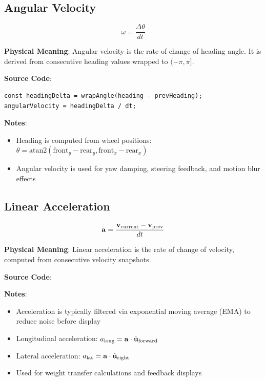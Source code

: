 \subsection{Angular Velocity}

\begin{equation}
  \omega = \frac{\Delta \theta}{dt}
  \label{eq:angular-velocity}
\end{equation}

\textbf{Physical Meaning}: Angular velocity is the rate of change of heading angle. It is derived from consecutive heading values wrapped to $(-\pi, \pi]$.

\textbf{Source Code}: 

\begin{lstlisting}[caption={Angular velocity computation with angle wrapping}]
const headingDelta = wrapAngle(heading - prevHeading);
angularVelocity = headingDelta / dt;
\end{lstlisting}

\textbf{Notes}:
\begin{itemize}
  \item Heading is computed from wheel positions: $\theta = \text{atan2}(\text{front}_y - \text{rear}_y, \text{front}_x - \text{rear}_x)$
  \item Angular velocity is used for yaw damping, steering feedback, and motion blur effects
\end{itemize}

\subsection{Linear Acceleration}

\begin{equation}
  \mathbf{a} = \frac{\mathbf{v}_{\text{current}} - \mathbf{v}_{\text{prev}}}{dt}
  \label{eq:linear-acceleration}
\end{equation}

\textbf{Physical Meaning}: Linear acceleration is the rate of change of velocity, computed from consecutive velocity snapshots.

\textbf{Source Code}: 

\textbf{Notes}:
\begin{itemize}
  \item Acceleration is typically filtered via exponential moving average (EMA) to reduce noise before display
  \item Longitudinal acceleration: $a_{\text{long}} = \mathbf{a} \cdot \hat{\mathbf{u}}_{\text{forward}}$
  \item Lateral acceleration: $a_{\text{lat}} = \mathbf{a} \cdot \hat{\mathbf{u}}_{\text{right}}$
  \item Used for weight transfer calculations and feedback displays
\end{itemize}

